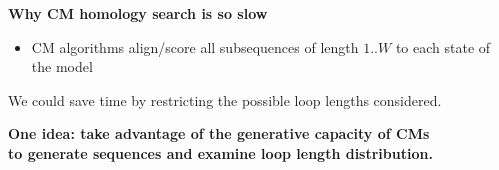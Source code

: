 \documentclass[landscape]{slides}
\begin{document}
\begin{slide}
\begin{center}
\textbf{Why CM homology search is so slow}
\end{center}

\medskip
\small
\begin{itemize}

\item
CM algorithms align/score all subsequences of length
$1..W$ to each state of the model
\end{itemize}


  We could save time by restricting the possible loop lengths
  considered.

  {\bf One idea: take advantage of the generative capacity of CMs \\ to generate
  sequences and examine loop length distribution.}

\vfill
\end{slide}
\end{document}
